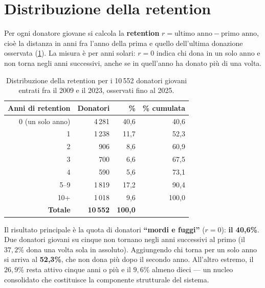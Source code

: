 \section{Distribuzione della retention}
\label{sec:ret_dist}

Per ogni donatore giovane si calcola la \textbf{retention}
$r = \text{ultimo anno} - \text{primo anno}$, cioè la distanza in anni fra
l'anno della prima e quello dell'ultima donazione osservata
(\cref{tab:ret_dist}). La misura è per anni solari: $r = 0$ indica chi dona in
un solo anno e non torna negli anni successivi, anche se in quell'anno ha
donato più di una volta.

\begin{table}[ht]
\centering
\caption{Distribuzione della retention per i 10\,552 donatori giovani entrati
fra il 2009 e il 2023, osservati fino al 2025.}
\label{tab:ret_dist}
\begin{tabular}{@{}rrrr@{}}
\toprule
\textbf{Anni di retention} & \textbf{Donatori} & \textbf{\%} & \textbf{\% cumulata} \\
\midrule
0  (un solo anno)      & 4\,281 & 40{,}6 & 40{,}6 \\
1                      & 1\,238 & 11{,}7 & 52{,}3 \\
2                      & \phantom{0}906 & \phantom{0}8{,}6 & 60{,}9 \\
3                      & \phantom{0}700 & \phantom{0}6{,}6 & 67{,}5 \\
4                      & \phantom{0}590 & \phantom{0}5{,}6 & 73{,}1 \\
5--9                   & 1\,819 & 17{,}2 & 90{,}4 \\
10+                    & 1\,018 & \phantom{0}9{,}6 & 100{,}0 \\
\midrule
\textbf{Totale}        & \textbf{10\,552} & \textbf{100{,}0} & \\
\bottomrule
\end{tabular}
\end{table}

Il risultato principale è la quota di donatori \textbf{``mordi e fuggi''}
($r = 0$): \textbf{il 40{,}6\%}. Due donatori giovani su cinque non tornano
negli anni successivi al primo (il $37{,}2\%$ dona una volta sola in assoluto).
Aggiungendo chi torna per un solo anno si arriva al \textbf{52{,}3\%}, che non
dona più dopo il secondo anno. All'altro estremo, il $26{,}9\%$ resta attivo
cinque anni o più e il $9{,}6\%$ almeno dieci --- un nucleo consolidato che
costituisce la componente strutturale del sistema.

